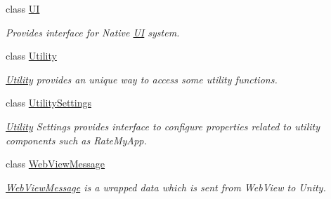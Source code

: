 \begin{DoxyCompactItemize}
class \hyperlink{class_voxel_busters_1_1_native_plugins_1_1_u_i}{U\+I}
\begin{DoxyCompactList}\small\item\em Provides interface for Native \hyperlink{class_voxel_busters_1_1_native_plugins_1_1_u_i}{U\+I} system. \end{DoxyCompactList}\item 
class \hyperlink{class_voxel_busters_1_1_native_plugins_1_1_utility}{Utility}
\begin{DoxyCompactList}\small\item\em \hyperlink{class_voxel_busters_1_1_native_plugins_1_1_utility}{Utility} provides an unique way to access some utility functions. \end{DoxyCompactList}\item 
class \hyperlink{class_voxel_busters_1_1_native_plugins_1_1_utility_settings}{Utility\+Settings}
\begin{DoxyCompactList}\small\item\em \hyperlink{class_voxel_busters_1_1_native_plugins_1_1_utility}{Utility} Settings provides interface to configure properties related to utility components such as Rate\+My\+App. \end{DoxyCompactList}\item 
class \hyperlink{class_voxel_busters_1_1_native_plugins_1_1_web_view_message}{Web\+View\+Message}
\begin{DoxyCompactList}\small\item\em \hyperlink{class_voxel_busters_1_1_native_plugins_1_1_web_view_message}{Web\+View\+Message} is a wrapped data which is sent from Web\+View to Unity. \end{DoxyCompactList}\end{DoxyCompactItemize}
